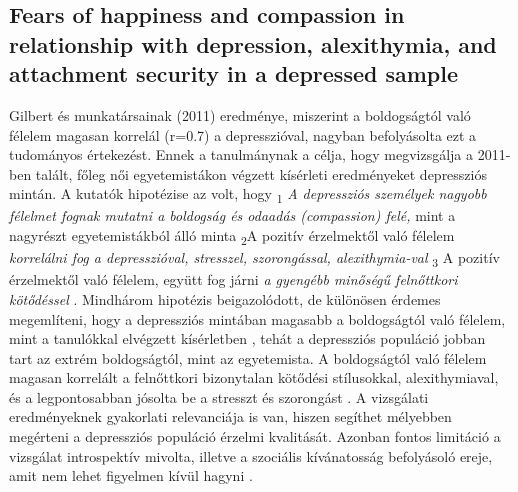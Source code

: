 \subsection*{Fears of happiness and compassion in relationship
	with depression, alexithymia, and attachment
	security in a depressed sample \cite{gilbert_mcewan_catarino_baiao_palmeira_2013}}
Gilbert és munkatársainak (2011) eredménye, miszerint a boldogságtól való félelem magasan korrelál (r=0.7) a depresszióval, nagyban befolyásolta ezt a tudományos értekezést. Ennek a tanulmánynak a célja, hogy megvizsgálja a 2011-ben talált, főleg női egyetemistákon végzett kísérleti eredményeket depressziós mintán. A kutatók hipotézise az volt,  hogy \textsubscript{1} \textit{ A depressziós személyek nagyobb félelmet fognak mutatni a boldogság és odaadás (compassion) felé,}  mint a nagyrészt egyetemis\-tákból álló minta \textsubscript{2}A pozitív érzelmektől való félelem \textit{korrelálni fog a depresszióval, stresszel, szorongással, alexithymia-val }   \textsubscript{3} A pozitív érzelmektől való félelem, együtt fog járni \textit{a gyengébb minőségű felnőttkori kötődéssel} \cite{gilbert_mcewan_catarino_baiao_palmeira_2013}. Mindhárom hipotézis beigazolódott, de különösen érdemes megemlíteni, hogy a depressziós mintában magasabb a boldogságtól való félelem, mint a tanulókkal elvégzett kísérletben \cite{gilbert_mcewan_gibbons_chotai_duarte_matos_2011}, tehát a depressziós populáció jobban tart az extrém boldogságtól, mint az egyetemista. A boldogságtól való félelem magasan korrelált a felnőttkori bizonytalan kötődési stílusokkal, alexithymiaval, és a legpontosabban jósolta be a stresszt és szorongást \cite{gilbert_mcewan_catarino_baiao_palmeira_2013}. A vizsgálati eredményeknek gyakorlati relevanciája is van, hiszen segíthet mélyebben megérteni a depressziós populáció érzelmi kvalitását. Azonban fontos limitáció a vizsgálat introspektív mivolta, illetve a szociális kívánatosság befolyásoló ereje, amit nem lehet figyelmen kívül hagyni \cite{gilbert_mcewan_catarino_baiao_palmeira_2013}.

